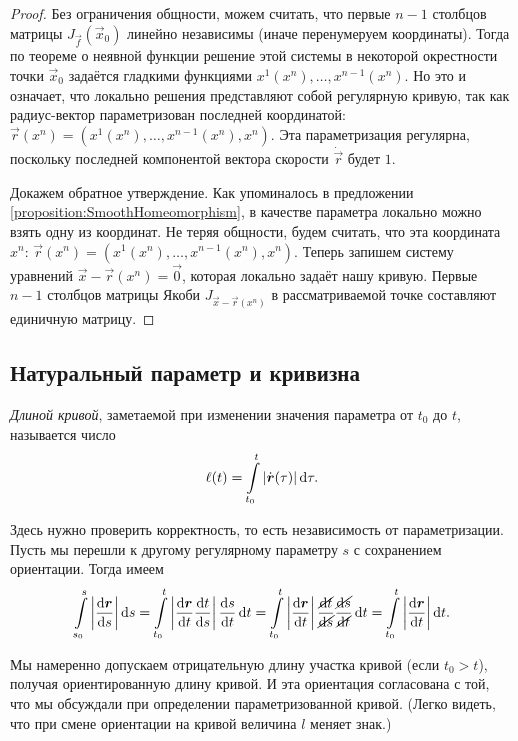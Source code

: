 \begin{proof}
	Без ограничения общности, можем считать, что первые $n - 1$ столбцов матрицы $J_{\vec{f}}(\vec{x}_0)$ линейно независимы (иначе перенумеруем координаты). Тогда по теореме о неявной функции решение этой системы в некоторой окрестности точки $\vec{x}_0$ задаётся гладкими функциями $x^1(x^n), \ldots, x^{n - 1}(x^n)$. Но это и означает, что локально решения представляют собой регулярную кривую, так как радиус-вектор параметризован последней координатой: $\vec{r}(x^n) = (x^1(x^n), \ldots, x^{n - 1}(x^n), x^n)$. Эта параметризация регулярна, поскольку последней компонентой вектора скорости $\dot{\vec{r}}$ будет $1$.

	Докажем обратное утверждение. Как упоминалось в предложении \ref{proposition:SmoothHomeomorphism}, в качестве параметра локально можно взять одну из координат. Не теряя общности, будем считать, что эта координата $x^n$: $\vec{r}(x^n) = (x^1(x^n), \ldots, x^{n - 1}(x^n), x^n)$. Теперь запишем систему уравнений $\vec{x} - \vec{r}(x^n) = \vec{0}$, которая локально задаёт нашу кривую. Первые $n - 1$ столбцов матрицы Якоби $J_{\vec{x} - \vec{r}(x^n)}$ в рассматриваемой точке составляют единичную матрицу.
\end{proof}

\subsection{Натуральный параметр и кривизна}

\begin{definition}
	\textit{Длиной кривой}, заметаемой при изменении значения параметра от $t_0$ до $t$, называется число
	\[
		\ell(t) = \int\limits_{t_0}^t\left\lvert\dot{\boldsymbol{r}}(\tau)\right\rvert\mathop{}\!\mathrm{d}\tau.
	\]
\end{definition}

Здесь нужно проверить корректность, то есть независимость от параметризации. Пусть мы перешли к другому регулярному параметру $s$ с сохранением ориентации. Тогда имеем
\[
	\int\limits_{s_0}^s\abs{\frac{\d\vec{r}}{\d s}}\d s = \int\limits_{t_0}^t\abs{\frac{\d\vec{r}}{\d t}\frac{\d t}{\d s}}\frac{\d s}{\d t}\d t = \int\limits_{t_0}^t\abs{\frac{\d\vec{r}}{\d t}}\frac{\cancel{\d t}}{\cancel{\d s}}\frac{\cancel{\d s}}{\cancel{\d t}}\d t = \int\limits_{t_0}^t\abs{\frac{\d\vec{r}}{\d t}}\d t.
\]

Мы намеренно допускаем отрицательную длину участка кривой (если $t_0 > t$), получая ориентированную длину кривой. И эта ориентация согласована с той, что мы обсуждали при определении параметризованной кривой. (Легко видеть, что при смене ориентации на кривой величина $l$ меняет знак.)

